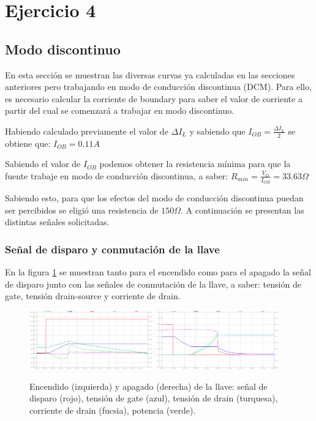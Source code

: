 \documentclass[e4_tp1_main.tex]{subfiles}
\begin{document}
	
	\section{Ejercicio 4}
	
	\subsection{Modo discontinuo}
	En esta sección se muestran las diversas curvas ya calculadas en las secciones anteriores pero trabajando en modo de conducción discontinua (DCM). Para ello, es necesario calcular la corriente de boundary para saber el valor de corriente a partir del cual se comenzará a trabajar en modo discontinuo.
	
	Habiendo calculado previamente el valor de $\Delta I_{L}$ y sabiendo que $I_{OB}=\frac{\Delta I_{L}}{2}$ se obtiene que: $I_{OB}=0.11A$    

	
	Sabiendo el valor de $I_{OB}$ podemos obtener la resistencia mínima para que la fuente trabaje en modo de conducción discontinua, a saber: $R_{min}=\frac{V_O}{I_{OB}}=33.63\Omega$

	
	Sabiendo esto, para que los efectos del modo de conducción discontinua puedan ser percibidos se eligió una resistencia de $150\Omega$.
	A continuación se presentan las distintas señales solicitadas.
	
	\subsubsection{Señal de disparo y conmutación de la llave}
	En la figura \ref{fig:llave_DCM} se muestran tanto para el encendido como para el apagado la señal de disparo junto con las señales de conmutación de la llave, a saber: tensión de gate, tensión drain-source y corriente de drain.
	
 	\begin{figure}[ht]
 		\centering
		\includegraphics[width=0.475\textwidth]{images/ej4/fig1.png}
		\hfill
		\includegraphics[width=0.475\textwidth]{images/ej4/fig2.png}
		\caption{Encendido (izquierda) y apagado (derecha) de la llave: señal de disparo (rojo), tensi\'on de gate (azul), tensi\'on de drain (turquesa), corriente de drain (fucsia), potencia (verde).}
		\label{fig:llave_DCM}
	\end{figure}
	
\end{document}
